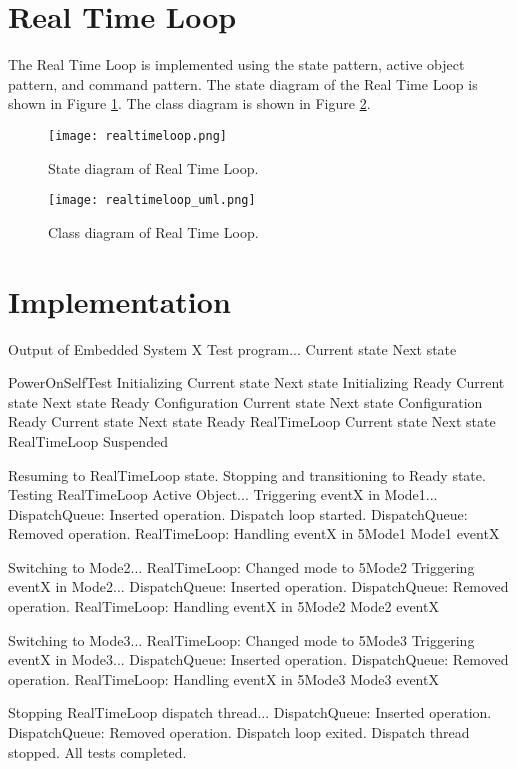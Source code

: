 \documentclass[../main.tex]{subfiles}
\begin{document}
\newpage

\section{Real Time Loop}

The Real Time Loop is implemented using the state pattern, active object pattern, and command pattern. The state diagram of the Real Time Loop is shown in Figure \ref{fig:rtl_state_diagram}. The class diagram is shown in Figure \ref{fig:rtl_implementation}.

\begin{figure}[h]
    \centering
    \texttt{[image: realtimeloop.png]}
    \caption{State diagram of Real Time Loop.}
    \label{fig:rtl_state_diagram}
\end{figure}

\begin{figure}[h]
    \centering
    \texttt{[image: realtimeloop\_uml.png]}
    \caption{Class diagram of Real Time Loop.}
    \label{fig:rtl_implementation}
\end{figure}

\newpage

\section{Implementation}

\begin{mintedterminal}{Output of Embedded System X}
Test program...
Current state   Next state

PowerOnSelfTest Initializing
Current state   Next state
Initializing    Ready
Current state   Next state
Ready           Configuration
Current state   Next state
Configuration   Ready
Current state   Next state
Ready           RealTimeLoop
Current state   Next state
RealTimeLoop    Suspended

Resuming to RealTimeLoop state.
Stopping and transitioning to Ready state.
Testing RealTimeLoop Active Object...
Triggering eventX in Mode1...
DispatchQueue: Inserted operation.
Dispatch loop started.
DispatchQueue: Removed operation.
RealTimeLoop: Handling eventX in 5Mode1
Mode1 eventX

Switching to Mode2...
RealTimeLoop: Changed mode to 5Mode2
Triggering eventX in Mode2...
DispatchQueue: Inserted operation.
DispatchQueue: Removed operation.
RealTimeLoop: Handling eventX in 5Mode2
Mode2 eventX

Switching to Mode3...
RealTimeLoop: Changed mode to 5Mode3
Triggering eventX in Mode3...
DispatchQueue: Inserted operation.
DispatchQueue: Removed operation.
RealTimeLoop: Handling eventX in 5Mode3
Mode3 eventX

Stopping RealTimeLoop dispatch thread...
DispatchQueue: Inserted operation.
DispatchQueue: Removed operation.
Dispatch loop exited.
Dispatch thread stopped.
All tests completed.
\end{mintedterminal}
\end{document}
